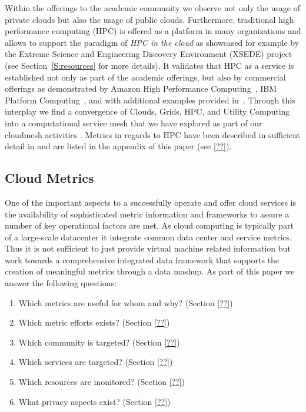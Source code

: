 \documentclass{sig-alternate-05-2015}
\begin{document}
Within the offerings to the academic community we observe not only the usage of private clouds but also the usage of public clouds. Furthermore, traditional high performance computing (HPC) is offered as a platform in many organizations and allows to support the paradigm of {\it HPC in the cloud} as showcased for example by the Extreme Science and Engineering Discovery Environment (XSEDE) project (see Section~\ref {S:resources} for more details).  It validates that HPC as a service is established not only as part of the academic offerings, but also by commercial offerings as demonstrated by Amazon High Performance Computing~\cite{awshpc}, IBM Platform Computing~\cite{ibmhpc}, and with additional examples provided in~\cite{DouglasEadline}. 
Through this interplay we find a convergence of Clouds, Grids, HPC, and Utility Computing into a computational service mesh that we have explored as part of our cloudmesh activities \cite{las14cloudmeshmultiple, las12fg-bookchapter}. Metrics in regards to HPC have been described in sufficient detail in \cite{las13xdmod} and are listed in the appendix of this paper (see \ref{??}).


\subsection{Cloud Metrics}

One of the important aspects to a successfully operate and offer cloud services is the availability of sophisticated metric information and frameworks to assure a number of key operational factors are met. As cloud computing is typically part of a large-scale datacenter it integrate common data center and service metrics. Thus it is not sufficient to just provide virtual machine related information but work towards a comprehensive integrated data framework that supports the creation of meaningful metrics through a data mashup. As part of this paper we answer the following questions:

\begin{enumerate}
\setlength\itemsep{-2pt}
\item Which metrics are useful for whom and why? (Section \ref{??})
\item Which metric efforts exists? (Section \ref{??})
\item Which community is targeted? (Section \ref{??})
\item Which services are targeted? (Section \ref{??})
\item Which resources are monitored? (Section \ref{??})
\item What privacy aspects exist? (Section \ref{??})
\end{enumerate}
\end{document}
